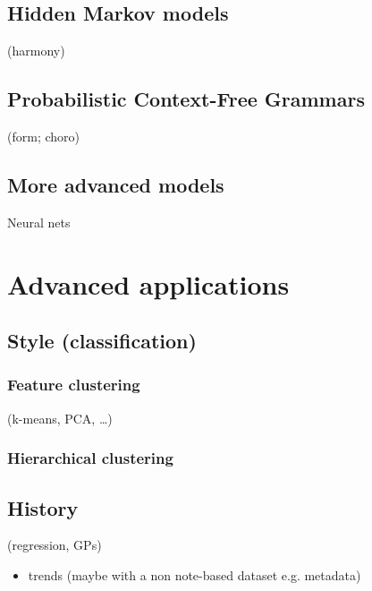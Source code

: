 \documentclass[letterpaper,10pt,english]{sphinxmanual}
\begin{document}
\section{Hidden Markov models}
\label{\detokenize{2_sequences:hidden-markov-models}}
(harmony)


\section{Probabilistic Context-Free Grammars}
\label{\detokenize{2_sequences:probabilistic-context-free-grammars}}
(form; choro)


\section{More advanced models}
\label{\detokenize{2_sequences:more-advanced-models}}
Neural nets


\chapter{Advanced applications}
\label{\detokenize{3_advanced:advanced-applications}}\label{\detokenize{3_advanced::doc}}

\section{Style (classification)}
\label{\detokenize{3_advanced:style-classification}}

\subsection{Feature clustering}
\label{\detokenize{3_advanced:feature-clustering}}
(k-means, PCA, …)


\subsection{Hierarchical clustering}
\label{\detokenize{3_advanced:hierarchical-clustering}}

\section{History}
\label{\detokenize{3_advanced:history}}
(regression, GPs)
\begin{itemize}
\item {} 
trends (maybe with a non note-based dataset e.g. metadata)

\end{itemize}
\end{document}
